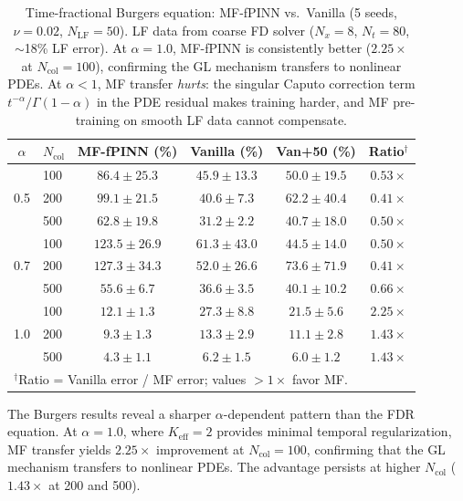 \documentclass[11pt]{article}
\newcommand{\Ncol}{N_{\mathrm{col}}}
\newcommand{\NLF}{N_{\mathrm{LF}}}
\begin{document}
\begin{table}[t]
\centering
\caption{Time-fractional Burgers equation: MF-fPINN vs.\ Vanilla (5 seeds, $\nu = 0.02$, $\NLF = 50$). LF data from coarse FD solver ($N_x = 8$, $N_t = 80$, $\sim$18\% LF error). At $\alpha = 1.0$, MF-fPINN is consistently better ($2.25\times$ at $\Ncol = 100$), confirming the GL mechanism transfers to nonlinear PDEs. At $\alpha < 1$, MF transfer \emph{hurts}: the singular Caputo correction term $t^{-\alpha}/\Gamma(1-\alpha)$ in the PDE residual makes training harder, and MF pre-training on smooth LF data cannot compensate.}
\label{tab:burgers}
\begin{tabular}{clcccc}
\toprule
$\alpha$ & $\Ncol$ & MF-fPINN (\%) & Vanilla (\%) & Van+50 (\%) & Ratio$^\dagger$ \\
\midrule
\multirow{3}{*}{0.5} & 100 & $86.4 \pm 25.3$ & $45.9 \pm 13.3$ & $50.0 \pm 19.5$ & $0.53\times$ \\
& 200 & $99.1 \pm 21.5$ & $40.6 \pm 7.3$ & $62.2 \pm 40.4$ & $0.41\times$ \\
& 500 & $62.8 \pm 19.8$ & $31.2 \pm 2.2$ & $40.7 \pm 18.0$ & $0.50\times$ \\
\midrule
\multirow{3}{*}{0.7} & 100 & $123.5 \pm 26.9$ & $61.3 \pm 43.0$ & $44.5 \pm 14.0$ & $0.50\times$ \\
& 200 & $127.3 \pm 34.3$ & $52.0 \pm 26.6$ & $73.6 \pm 71.9$ & $0.41\times$ \\
& 500 & $55.6 \pm 6.7$ & $36.6 \pm 3.5$ & $40.1 \pm 10.2$ & $0.66\times$ \\
\midrule
\multirow{3}{*}{1.0} & 100 & $\mathbf{12.1 \pm 1.3}$ & $27.3 \pm 8.8$ & $21.5 \pm 5.6$ & $\mathbf{2.25\times}$ \\
& 200 & $\mathbf{9.3 \pm 1.3}$ & $13.3 \pm 2.9$ & $11.1 \pm 2.8$ & $\mathbf{1.43\times}$ \\
& 500 & $\mathbf{4.3 \pm 1.1}$ & $6.2 \pm 1.5$ & $6.0 \pm 1.2$ & $\mathbf{1.43\times}$ \\
\bottomrule
\multicolumn{6}{l}{\small $^\dagger$Ratio = Vanilla error / MF error; values $>1\times$ favor MF.} \\
\end{tabular}
\end{table}

The Burgers results reveal a sharper $\alpha$-dependent pattern than the FDR equation. At $\alpha = 1.0$, where $K_{\mathrm{eff}} = 2$ provides minimal temporal regularization, MF transfer yields $2.25\times$ improvement at $\Ncol = 100$, confirming that the GL mechanism transfers to nonlinear PDEs. The advantage persists at higher $\Ncol$ ($1.43\times$ at 200 and 500).
\end{document}
